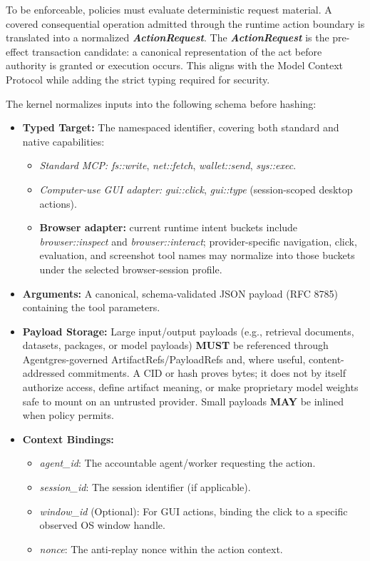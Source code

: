 \documentclass[
  11pt,
]{article}
\providecommand{\tightlist}{%
  \setlength{\itemsep}{0pt}\setlength{\parskip}{0pt}}
\begin{document}
To be enforceable, policies must evaluate deterministic request material. A
covered consequential operation admitted through the runtime action boundary is
translated into a normalized \emph{\textbf{ActionRequest}}. The
\emph{\textbf{ActionRequest}} is the pre-effect transaction candidate: a
canonical representation of the act before authority is granted or
execution occurs. This aligns with the Model Context Protocol while
adding the strict typing required for security.

The kernel normalizes inputs into the following schema before hashing:

\begin{itemize}
\item
  \textbf{Typed Target:} The namespaced identifier, covering both
  standard and native capabilities:

  \begin{itemize}
  \tightlist
  \item
    \emph{Standard MCP: fs::write}, \emph{net::fetch},
    \emph{wallet::send}, \emph{sys::exec}.
  \item
    \emph{Computer-use GUI adapter:} \emph{gui::click}, \emph{gui::type}
    (session-scoped desktop actions).
  \item
    \textbf{Browser adapter:} current runtime intent buckets include
    \emph{browser::inspect} and \emph{browser::interact}; provider-specific
    navigation, click, evaluation, and screenshot tool names may normalize into
    those buckets under the selected browser-session profile.
  \end{itemize}
\item
  \textbf{Arguments:} A canonical, schema-validated JSON payload (RFC
  8785) containing the tool parameters.
\item
  \textbf{Payload Storage:} Large input/output payloads (e.g., retrieval
  documents, datasets, packages, or model payloads) \textbf{MUST} be
  referenced through Agentgres-governed ArtifactRefs/PayloadRefs and,
  where useful, content-addressed commitments. A CID or hash proves bytes;
  it does not by itself authorize access, define artifact meaning, or make
  proprietary model weights safe to mount on an untrusted provider.
  Small payloads \textbf{MAY} be inlined when policy permits.
\item
  \textbf{Context Bindings:}

  \begin{itemize}
  \tightlist
  \item
    \emph{agent\_id}: The accountable agent/worker requesting the action.
  \item
    \emph{session\_id}: The session identifier (if applicable).
  \item
    \emph{window\_id} (Optional): For GUI actions, binding the click to
    a specific observed OS window handle.
  \item
    \emph{nonce}: The anti-replay nonce within the action context.
  \end{itemize}
\end{itemize}
\end{document}
